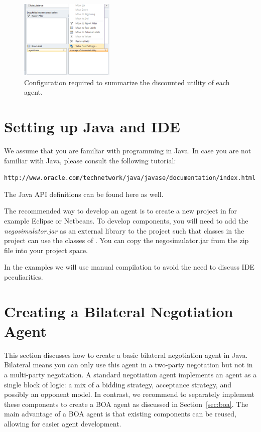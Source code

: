 \documentclass[]{article}
\begin{document}
\begin{figure}[htb]
	\centering
	\includegraphics[width=0.4\textwidth]{media/PivotTable.png}
\caption{Configuration required to summarize the discounted utility of each agent.}\label{fig:pivottable}
\end{figure}



\section{Setting up Java and IDE}
We assume that you are familiar with programming in Java. In case you are not familiar with Java, please consult the following tutorial: 

\texttt{http://www.oracle.com/technetwork/java/javase/documentation/index.html} 

The Java API definitions can be found here as well.

The recommended way to develop an agent is to create a new project in for example Eclipse or Netbeans. 
To develop \Genius components, you will need to add the \textit{negosimulator.jar} as an external library to the project such that classes in the project can use the classes of \Genius. You can copy the negosimulator.jar from the zip file into your project space.

In the examples we will use manual compilation to avoid the need to discuss IDE peculiarities.



\section{Creating a Bilateral Negotiation Agent}
This section discusses how to create a basic bilateral negotiation agent in Java. Bilateral means you can only use this agent in a two-party negotation but not in a multi-party negotiation. A standard negotiation agent implements an agent as a single block of logic: a mix of a bidding strategy, acceptance strategy, and possibly an opponent model. In contrast, we recommend to separately implement these components to create a BOA agent as discussed in Section~\ref{sec:boa}. The main advantage of a BOA agent is that existing components can be reused, allowing for easier agent development.
\end{document}

